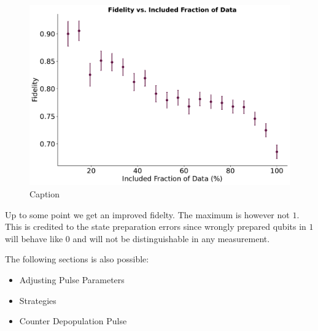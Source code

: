 \begin{figure}
    \centering
    \includegraphics[]{Readout/Figs/fidelity_vs_included_fraction.pdf}
    \caption{Caption}
    \label{fig:enter-label}
\end{figure}

Up to some point we get an improved fidelty. The maximum is however not $1$. This is credited to the state preparation errors since wrongly prepared qubits in $1$ will behave like $0$ and will not be distinguishable in any measurement. 


The following sections is also possible:
\begin{itemize}
    \item Adjusting Pulse Parameters
    \item Strategies
    \item Counter Depopulation Pulse
\end{itemize}



